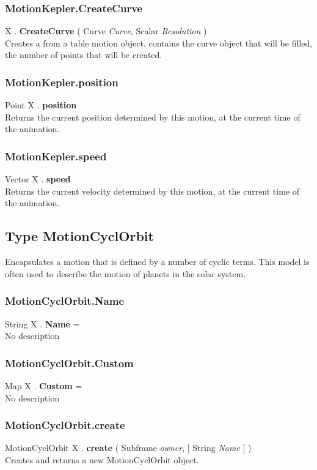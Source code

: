 \subsubsection{MotionKepler.CreateCurve \label{F:MotionKepler:CreateCurve}}
X . \textbf{CreateCurve} ( Curve \textit{Curve}, Scalar \textit{Resolution} ) \\
Creates a  from a table motion object.  contains the curve object that will be filled,  the number of points that will be created.


\subsubsection{MotionKepler.position \label{F:MotionKepler:position}}
Point X . \textbf{position} \\
Returns the current position determined by this motion, at the current time of the animation.


\subsubsection{MotionKepler.speed \label{F:MotionKepler:speed}}
Vector X . \textbf{speed} \\
Returns the current velocity determined by this motion, at the current time of the animation.

\subsection{Type MotionCyclOrbit \label{T:MotionCyclOrbit}}
Encapsulates a motion that is defined by a number of cyclic terms. This model is often used to describe the motion of planets in the solar system.

\subsubsection{MotionCyclOrbit.Name \label{F:MotionCyclOrbit:Name}}
String X . \textbf{Name} = \\
No description

\subsubsection{MotionCyclOrbit.Custom \label{F:MotionCyclOrbit:Custom}}
Map X . \textbf{Custom} = \\
No description

\subsubsection{MotionCyclOrbit.create \label{F:MotionCyclOrbit:create}}
MotionCyclOrbit X . \textbf{create} ( Subframe \textit{owner},  [ String \textit{Name} ] ) \\
Creates and returns a new MotionCyclOrbit object.

